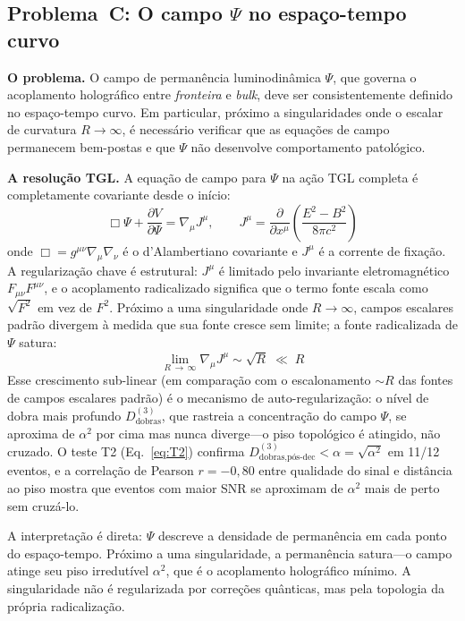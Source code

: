 \documentclass[12pt,a4paper,twocolumn]{article}
\newcommand{\alphaii}{\alpha^{2}}
\newcommand{\boundary}{\textit{fronteira}}
\newcommand{\bulk}{\textit{bulk}}
\begin{document}
\subsection{Problema~C: O campo $\Psi$ no espaço-tempo curvo}
\label{sec:problem_c}

\textbf{O problema.} O campo de permanência luminodinâmica $\Psi$, que governa
o acoplamento holográfico entre \boundary{} e \bulk, deve ser consistentemente
definido no espaço-tempo curvo. Em particular, próximo a singularidades onde
o escalar de curvatura $R \to \infty$, é necessário verificar que as equações
de campo permanecem bem-postas e que $\Psi$ não desenvolve comportamento
patológico.

\textbf{A resolução TGL.} A equação de campo para $\Psi$ na ação TGL completa
é completamente covariante desde o início:
\begin{equation}
\Box\Psi + \frac{\partial V}{\partial\Psi} = \nabla_\mu J^\mu, \qquad
J^\mu = \frac{\partial}{\partial x^\mu}\!\left(\frac{E^2 - B^2}{8\pi c^2}\right)
\label{eq:Psi_eom}
\end{equation}
onde $\Box = g^{\mu\nu}\nabla_\mu\nabla_\nu$ é o d'Alambertiano covariante
e $J^\mu$ é a corrente de fixação. A regularização chave é estrutural:
$J^\mu$ é limitado pelo invariante eletromagnético $F_{\mu\nu}F^{\mu\nu}$,
e o acoplamento radicalizado significa que o termo fonte escala como
$\sqrt{F^2}$ em vez de $F^2$. Próximo a uma singularidade onde $R \to \infty$,
campos escalares padrão divergem à medida que sua fonte cresce sem limite;
a fonte radicalizada de $\Psi$ satura:
\begin{equation}
\lim_{R\,\to\,\infty} \nabla_\mu J^\mu \sim \sqrt{R} \;\ll\; R
\label{eq:saturation}
\end{equation}
Esse crescimento sub-linear (em comparação com o escalonamento $\sim R$ das
fontes de campos escalares padrão) é o mecanismo de auto-regularização: o
nível de dobra mais profundo $D_{\text{dobras}}^{(3)}$, que rastreia a
concentração do campo $\Psi$, se aproxima de $\alphaii$ por cima mas nunca
diverge---o piso topológico é atingido, não cruzado. O teste T2
(Eq.~\ref{eq:T2}) confirma $D_{\text{dobras},\text{pós-dec}}^{(3)} < \alpha
= \sqrt{\alphaii}$ em 11/12 eventos, e a correlação de Pearson $r = -0{,}80$
entre qualidade do sinal e distância ao piso mostra que eventos com maior
SNR se aproximam de $\alphaii$ mais de perto sem cruzá-lo.

A interpretação é direta: $\Psi$ descreve a densidade de permanência em
cada ponto do espaço-tempo. Próximo a uma singularidade, a permanência
satura---o campo atinge seu piso irredutível $\alphaii$, que é o acoplamento
holográfico mínimo. A singularidade não é regularizada por correções quânticas,
mas pela topologia da própria radicalização.
\end{document}
